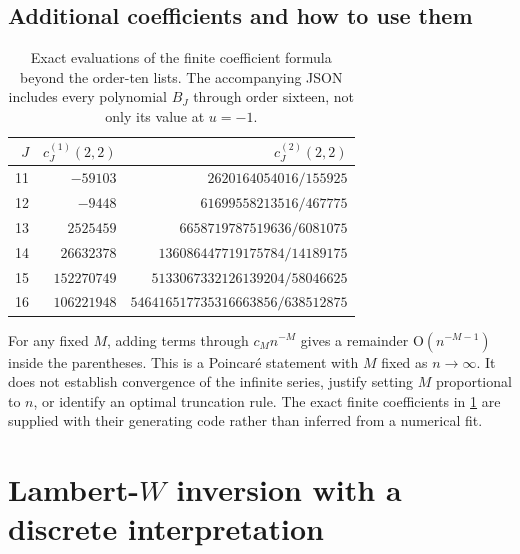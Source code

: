\documentclass[11pt]{article}
\numberwithin{equation}{section}
\theoremstyle{definition}
\theoremstyle{remark}
\theoremstyle{definition}
\newcommand{\bigO}{\mathrm O}
\begin{document}
\subsection{Additional coefficients and how to use them}

\begin{table}[htbp]
\centering
\small
\renewcommand{\arraystretch}{1.22}
\begin{tabular}{r r r}
\toprule
$J$ & $c_J^{(1)}(2,2)$ & $c_J^{(2)}(2,2)$\\
\midrule
11 & $-59103$ & $2620164054016/155925$\\
12 & $-9448$ & $61699558213516/467775$\\
13 & $2525459$ & $6658719787519636/6081075$\\
14 & $26632378$ & $136086447719175784/14189175$\\
15 & $152270749$ & $5133067332126139204/58046625$\\
16 & $106221948$ & $546416517735316663856/638512875$\\
\bottomrule
\end{tabular}
\caption{Exact evaluations of the finite coefficient formula beyond the
order-ten lists. The accompanying JSON includes every polynomial $B_J$ through
order sixteen, not only its value at $u=-1$.}
\label{spf:tab:extra}
\end{table}

For any fixed $M$, adding terms through $c_Mn^{-M}$ gives a remainder
$\bigO(n^{-M-1})$ inside the parentheses. This is a Poincar\'e statement with
$M$ fixed as $n\to\infty$. It does not establish convergence of the infinite
series, justify setting $M$ proportional to $n$, or identify an optimal
truncation rule. The exact finite coefficients in \cref{spf:tab:extra} are supplied
with their generating code rather than inferred from a numerical fit.

\section{Lambert-\texorpdfstring{$W$}{W} inversion with a discrete interpretation}
\label{spf:sec:inverse}
\end{document}
